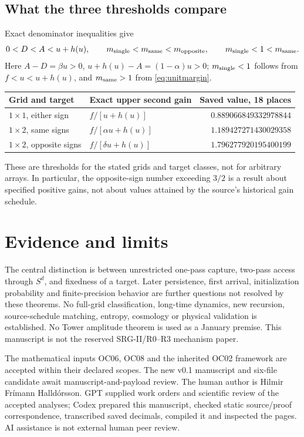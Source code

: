 \documentclass[11pt,a4paper]{article}
\theoremstyle{definition}
\theoremstyle{remark}\newtheorem{remark}[theorem]{Remark}
\numberwithin{equation}{section}
\begin{document}
\subsection{What the three thresholds compare}
Exact denominator inequalities give
\begin{equation}\label{eq:thresholdorder}
 0<D<A<u+h(u),\qquad
 m_{\rm single}<m_{\rm same}<m_{\rm opposite},\qquad
 m_{\rm single}<1<m_{\rm same}.
\end{equation}
Here $A-D=\beta u>0$, $u+h(u)-A=(1-\alpha)u>0$;
$m_{\rm single}<1$ follows from $f<u<u+h(u)$, and $m_{\rm same}>1$
from \eqref{eq:unitmargin}.

\begin{center}
\begin{tabular}{@{}llr@{}}
\toprule Grid and target & Exact upper second gain & Saved value, 18 places\\
\midrule
$1\times1$, either sign & $f/[u+h(u)]$ & $0.889066849332978844$\\
$1\times2$, same signs & $f/[\alpha u+h(u)]$ & $1.189427271430029358$\\
$1\times2$, opposite signs & $f/[\delta u+h(u)]$ & $1.796277920195400199$\\
\bottomrule
\end{tabular}
\end{center}
These are thresholds for the stated grids and target classes, not for arbitrary
arrays. In particular, the opposite-sign number exceeding $3/2$ is a result about
specified positive gains, not about values attained by the source's historical
gain schedule.

\section{Evidence and limits}\label{sec:evidence}
The central distinction is between unrestricted one-pass capture, two-pass access
through $S^d$, and fixedness of a target. Later persistence, first arrival,
initialization probability and finite-precision behavior are further questions
not resolved by these theorems. No full-grid classification, long-time dynamics,
new recursion, source-schedule matching, entropy, cosmology or physical validation
is established. No Tower amplitude theorem is used as a January premise.
This manuscript is not the reserved SRG-II/R0--R3 mechanism paper.

The mathematical inputs OC06, OC08 and the inherited OC02 framework are accepted
within their declared scopes. The new v0.1 manuscript and six-file candidate
await manuscript-and-payload review. The human author is Hilmir Frímann Halldórsson.
GPT supplied work orders and scientific review of the accepted analyses;
Codex prepared this manuscript, checked static source/proof correspondence,
transcribed saved decimals, compiled it and inspected the pages. AI assistance
is not external human peer review.
\end{document}
